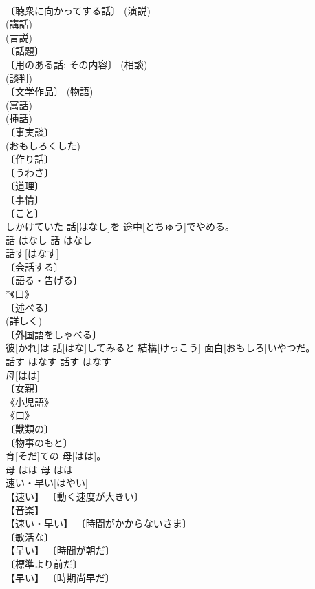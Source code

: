 \documentclass[8pt]{extreport}
\begin{document}
\begin{CJK}{UTF8}{min}
\\	〔聴衆に向かってする話〕 (演説) 
\\	(講話) 
\\	(言説) 
\\	〔話題〕 
\\	〔用のある話; その内容〕 (相談) 
\\	(談判) 
\\	〔文学作品〕 (物語) 
\\	(寓話) 
\\	(挿話) 
\\	〔事実談〕 
\\	(おもしろくした) 
\\	〔作り話〕 
\\	〔うわさ〕 
\\	〔道理〕 
\\	〔事情〕 
\\	〔こと〕 
\\	しかけていた 話[はなし]を 途中[とちゅう]でやめる。	
\\	話	はなし	話	はなし	
\\	話す[はなす]	
\\	〔会話する〕 
\\	〔語る・告げる〕 
\\	*《口》 
\\	〔述べる〕 
\\	(詳しく) 
\\	〔外国語をしゃべる〕 
\\	彼[かれ]は 話[はな]してみると 結構[けっこう] 面白[おもしろ]いやつだ。	
\\	話す	はなす	話す	はなす	
\\	母[はは]	
\\	〔女親〕 
\\	《小児語》 
\\	《口》 
\\	〔獣類の〕 
\\	〔物事のもと〕 
\\	育[そだ]ての 母[はは]。	
\\	母	はは	母	はは	
\\	速い・早い[はやい]	
\\	【速い】 〔動く速度が大きい〕 
\\	【音楽】 
\\	【速い・早い】 〔時間がかからないさま〕 
\\	〔敏活な〕 
\\	【早い】 〔時間が朝だ〕 
\\	〔標準より前だ〕 
\\	【早い】 〔時期尚早だ〕 

\end{CJK}
\end{document}
